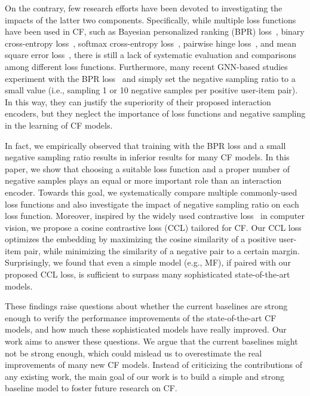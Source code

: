 \documentclass[sigconf,authorversion]{acmart}
\begin{document}
On the contrary, few research efforts have been devoted to investigating the impacts of the latter two components. Specifically, while multiple loss functions have been used in CF, such as Bayesian personalized ranking (BPR) loss~\cite{BPR}, binary cross-entropy loss~\cite{NeuMF}, softmax cross-entropy loss~\cite{YouTubeNet}, pairwise hinge loss~\cite{CML}, and mean square error loss~\cite{ENMF},
there is still a lack of systematic evaluation and comparisons among different loss functions. Furthermore, many recent GNN-based studies~\cite{NGCF,LightGCN,DGCF,NIA-GCN,BGCF} experiment with the BPR loss~\cite{BPR} and simply set the negative sampling ratio to a small value (i.e., sampling 1 or 10 negative samples per positive user-item pair). In this way, they can justify the superiority of their proposed interaction encoders, but they neglect the importance of loss functions and negative sampling in the learning of CF models. 

In fact, we empirically observed that training with the BPR loss and a small negative sampling ratio results in inferior results for many CF models. In this paper, we show that choosing a suitable loss function and a proper number of negative samples plays an equal or more important role than an interaction encoder. Towards this goal, we systematically compare multiple commonly-used loss functions and also investigate the impact of negative sampling ratio on each loss function. Moreover, inspired by the widely used contrastive loss~\cite{ContrastiveLoss1,ContrastiveLoss2} in computer vision, we propose a cosine contrastive loss (CCL) tailored for CF. Our CCL loss optimizes the embedding by maximizing the cosine similarity of a positive user-item pair, while minimizing the similarity of a negative pair to a certain margin. Surprisingly, we found that even a simple model (e.g., MF), if paired with our proposed CCL loss, is sufficient to surpass many sophisticated state-of-the-art models.






These findings raise questions about whether the current baselines are strong enough to verify the performance improvements of the state-of-the-art CF models, and how much these sophisticated models have really improved. Our work aims to answer these questions. We argue that the current baselines might not be strong enough, which could mislead us to overestimate the real improvements of many new CF models. Instead of criticizing the contributions of any existing work, the main goal of our work is to build a simple and strong baseline model to foster future research on CF. 
\end{document}
